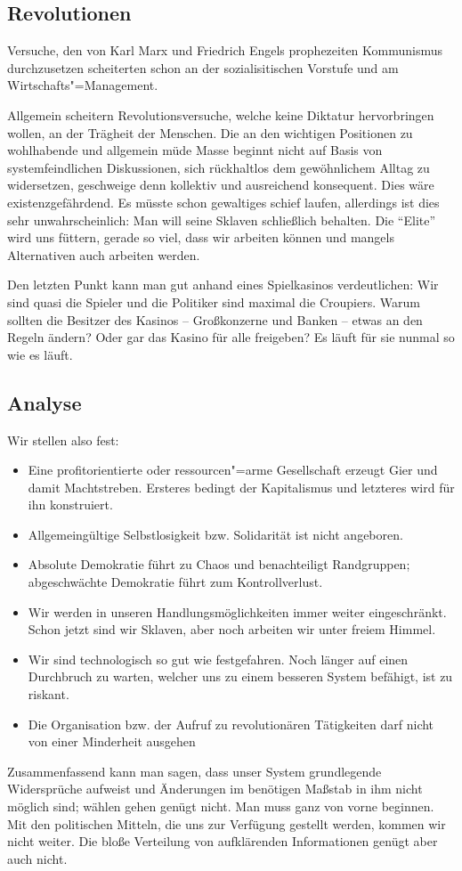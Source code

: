 \subsection{Revolutionen}\label{sec:situation/revolutions}

Versuche, den von Karl Marx und Friedrich Engels prophezeiten Kommunismus durchzusetzen scheiterten schon an der sozialisitischen Vorstufe und am Wirtschafts"=Management.

Allgemein scheitern Revolutionsversuche, welche keine Diktatur hervorbringen wollen, an der Trägheit der Menschen. Die an den wichtigen Positionen zu wohlhabende und allgemein müde Masse beginnt nicht auf Basis von systemfeindlichen Diskussionen, sich rückhaltlos dem gewöhnlichem Alltag zu widersetzen, geschweige denn kollektiv und ausreichend konsequent. Dies wäre existenzgefährdend. Es müsste schon gewaltiges schief laufen, allerdings ist dies sehr unwahrscheinlich: Man will seine Sklaven schließlich behalten. Die "`Elite"' wird uns füttern, gerade so viel, dass wir arbeiten können und mangels Alternativen auch arbeiten werden.

Den letzten Punkt kann man gut anhand eines Spielkasinos verdeutlichen: Wir sind quasi die Spieler und die Politiker sind maximal die Croupiers. Warum sollten die Besitzer des Kasinos -- Großkonzerne und Banken -- etwas an den Regeln ändern? Oder gar das Kasino für alle freigeben? Es läuft für sie nunmal so wie es läuft.

\subsection{Analyse}\label{sec:situation/analysis}

Wir stellen also fest:
\begin{itemize}
\item Eine profitorientierte oder ressourcen"=arme Gesellschaft erzeugt Gier und damit Machtstreben. Ersteres bedingt der Kapitalismus und letzteres wird für ihn konstruiert.
\item Allgemeingültige Selbstlosigkeit bzw. Solidarität ist nicht angeboren.
\item Absolute Demokratie führt zu Chaos und benachteiligt Randgruppen; abgeschwächte Demokratie führt zum Kontrollverlust.
\item Wir werden in unseren Handlungsmöglichkeiten immer weiter eingeschränkt. Schon jetzt sind wir Sklaven, aber noch arbeiten wir unter freiem Himmel.
\item Wir sind technologisch so gut wie festgefahren. Noch länger auf einen Durchbruch zu warten, welcher uns zu einem besseren System befähigt, ist zu riskant.
\item Die Organisation bzw. der Aufruf zu revolutionären Tätigkeiten darf nicht von einer Minderheit ausgehen
\end{itemize}

Zusammenfassend kann man sagen, dass unser System grundlegende Widersprüche aufweist und Änderungen im benötigen Maßstab in ihm nicht möglich sind; wählen gehen genügt nicht. Man muss ganz von vorne beginnen. Mit den politischen Mitteln, die uns zur Verfügung gestellt werden, kommen wir nicht weiter. Die bloße Verteilung von aufklärenden Informationen genügt aber auch nicht.